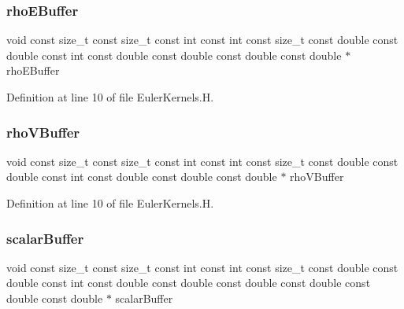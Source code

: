 \hypertarget{EulerKernels_8H_a7415fc29d2ee252183df8b0d418b92af}{}\label{EulerKernels_8H_a7415fc29d2ee252183df8b0d418b92af} 
\subsubsection{\texorpdfstring{rho\+E\+Buffer}{rhoEBuffer}}
{\footnotesize\ttfamily void const size\+\_\+t const size\+\_\+t const int const int const size\+\_\+t const double const double const int const double const double const double const double $\ast$ rho\+E\+Buffer}



Definition at line 10 of file Euler\+Kernels.\+H.

\hypertarget{EulerKernels_8H_a7c23aa68122eb669ea5c4afb5a53e7cf}{}\label{EulerKernels_8H_a7c23aa68122eb669ea5c4afb5a53e7cf} 
\subsubsection{\texorpdfstring{rho\+V\+Buffer}{rhoVBuffer}}
{\footnotesize\ttfamily void const size\+\_\+t const size\+\_\+t const int const int const size\+\_\+t const double const double const int const double const double const double $\ast$ rho\+V\+Buffer}



Definition at line 10 of file Euler\+Kernels.\+H.

\hypertarget{EulerKernels_8H_aab1a00a65c2606add640aea91f141b7d}{}\label{EulerKernels_8H_aab1a00a65c2606add640aea91f141b7d} 
\subsubsection{\texorpdfstring{scalar\+Buffer}{scalarBuffer}}
{\footnotesize\ttfamily void const size\+\_\+t const size\+\_\+t const int const int const size\+\_\+t const double const double const int const double const double const double const double const double const double $\ast$ scalar\+Buffer}



